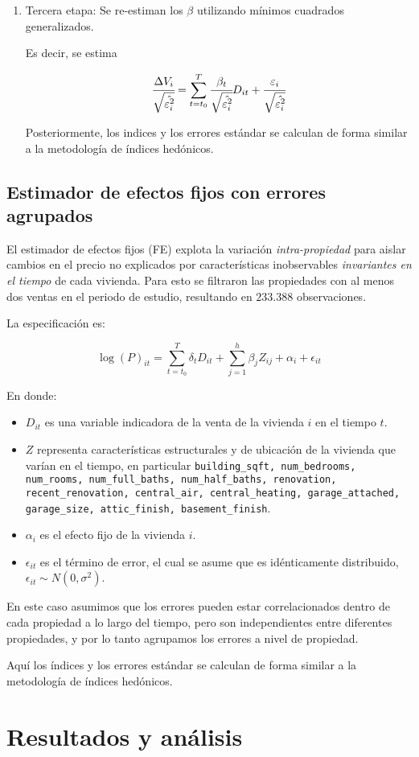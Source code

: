 \documentclass[conference]{IEEEtran}
\begin{document}
\begin{enumerate}
  \item Tercera etapa: Se re-estiman los $\beta$ utilizando mínimos cuadrados generalizados.
  
  Es decir, se estima 

  \[ \cfrac{\Delta V_i}{\sqrt{\hat{\varepsilon_i^2}}} = \sum_{t=t_0}^{T} \cfrac{\beta_t}{\sqrt{\hat{\varepsilon_i^2}}} D_{it} + \cfrac{\varepsilon_{i}}{\sqrt{\hat{\varepsilon_i^2}}} \]

  Posteriormente, los indices y los errores estándar se calculan de forma similar a la metodología de índices hedónicos.

\end{enumerate}


\subsection{Estimador de efectos fijos con errores agrupados}

El estimador de efectos fijos (FE) explota la variación \emph{intra-propiedad} para aislar cambios en el precio no explicados por características inobservables \emph{invariantes en el tiempo} de cada vivienda. 
Para esto se filtraron las propiedades con al menos dos ventas en el periodo de estudio, resultando en $233.388$ observaciones.

La especificación es:

\[ \log(P)_{it} = \sum_{t=t_0}^{T} \delta_t D_{it} + \sum_{j=1}^h \beta_j Z_{ij} + \alpha_i + \epsilon_{it} \]

En donde:

\begin{itemize}
  \item $D_{it}$ es una variable indicadora de la venta de la vivienda $i$ en el tiempo $t$.
  \item $Z$ representa características estructurales y de ubicación de la vivienda que varían en el tiempo, en particular 
  \texttt{building\_sqft, num\_bedrooms, num\_rooms, num\_full\_baths, num\_half\_baths, renovation, recent\_renovation, central\_air, central\_heating, garage\_attached, garage\_size, attic\_finish, basement\_finish}.
  \item $\alpha_i$ es el efecto fijo de la vivienda $i$.
  \item $\epsilon_{it}$ es el término de error, el cual se asume que es idénticamente distribuido, $\epsilon_{it} \sim N(0, \sigma^2)$.
\end{itemize}

En este caso asumimos que los errores pueden estar correlacionados dentro de cada propiedad a lo largo del tiempo, pero son independientes entre diferentes propiedades, y por lo tanto 
agrupamos los errores a nivel de propiedad.

Aquí los índices y los errores estándar se calculan de forma similar a la metodología de índices hedónicos.

\section{Resultados y análisis}
\end{document}
